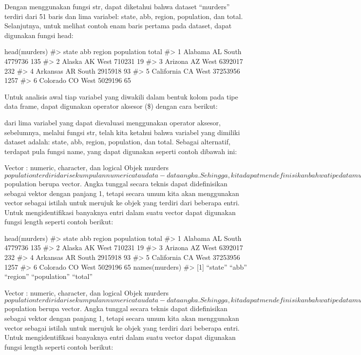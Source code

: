 \documentclass[
]{article}
\begin{document}
Dengan menggunakan fungsi str, dapat diketahui bahwa dataset ``murders''
terdiri dari 51 baris dan lima variabel: state, abb, region, population,
dan total. Selanjutnya, untuk melihat contoh enam baris pertama pada
dataset, dapat digunakan fungsi head:

head(murders) \#\textgreater{} state abb region population total
\#\textgreater{} 1 Alabama AL South 4779736 135 \#\textgreater{} 2
Alaska AK West 710231 19 \#\textgreater{} 3 Arizona AZ West 6392017 232
\#\textgreater{} 4 Arkansas AR South 2915918 93 \#\textgreater{} 5
California CA West 37253956 1257 \#\textgreater{} 6 Colorado CO West
5029196 65

Untuk analisis awal tiap variabel yang diwakili dalam bentuk kolom pada
tipe data frame, dapat digunakan operator aksesor (\$) dengan cara
berikut:

dari lima variabel yang dapat dievaluasi menggunakan operator aksesor,
sebelumnya, melalui fungsi str, telah kita ketahui bahwa variabel yang
dimiliki dataset adalah: state, abb, region, population, dan total.
Sebagai alternatif, terdapat pula fungsi name, yang dapat digunakan
seperti contoh dibawah ini:

Vector : numeric, character, dan logical Objek
murders\(population terdiri dari sekumpulan numeric atau data-data angka. Sehingga, kita dapat mendefinisikan bahwa tipe data murders\)population
berupa vector. Angka tunggal secara teknis dapat didefinisikan sebagai
vektor dengan panjang 1, tetapi secara umum kita akan menggunakan vector
sebagai istilah untuk merujuk ke objek yang terdiri dari beberapa entri.
Untuk mengidentifikasi banyaknya entri dalam suatu vector dapat
digunakan fungsi length seperti contoh berikut:

head(murders) \#\textgreater{} state abb region population total
\#\textgreater{} 1 Alabama AL South 4779736 135 \#\textgreater{} 2
Alaska AK West 710231 19 \#\textgreater{} 3 Arizona AZ West 6392017 232
\#\textgreater{} 4 Arkansas AR South 2915918 93 \#\textgreater{} 5
California CA West 37253956 1257 \#\textgreater{} 6 Colorado CO West
5029196 65 names(murders) \#\textgreater{} {[}1{]} ``state'' ``abb''
``region'' ``population'' ``total''

Vector : numeric, character, dan logical Objek
murders\(population terdiri dari sekumpulan numeric atau data-data angka. Sehingga, kita dapat mendefinisikan bahwa tipe data murders\)population
berupa vector. Angka tunggal secara teknis dapat didefinisikan sebagai
vektor dengan panjang 1, tetapi secara umum kita akan menggunakan vector
sebagai istilah untuk merujuk ke objek yang terdiri dari beberapa entri.
Untuk mengidentifikasi banyaknya entri dalam suatu vector dapat
digunakan fungsi length seperti contoh berikut:
\end{document}
